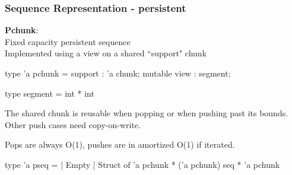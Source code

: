 \begin{frame}[fragile]
\frametitle{Sequence Representation - persistent}

\textbf{Pchunk}:\\
Fixed capacity persistent sequence\\
Implemented using a view on a shared ``support" chunk

\begin{caml}
  type 'a pchunk = {
    support : 'a chunk;
    mutable view : segment; }
\end{caml}

\begin{caml}
type segment = int * int
\end{caml}

\medskip

The shared chunk is reusable when popping or when pushing past its bounds. Other push cases need copy-on-write.

\medskip

Pops are always O(1), pushes are in amortized O(1) if iterated.

\begin{caml}
 type 'a pseq =
 | Empty
 | Struct of 'a pchunk * ('a pchunk) seq * 'a pchunk
\end{caml}

\end{frame}

